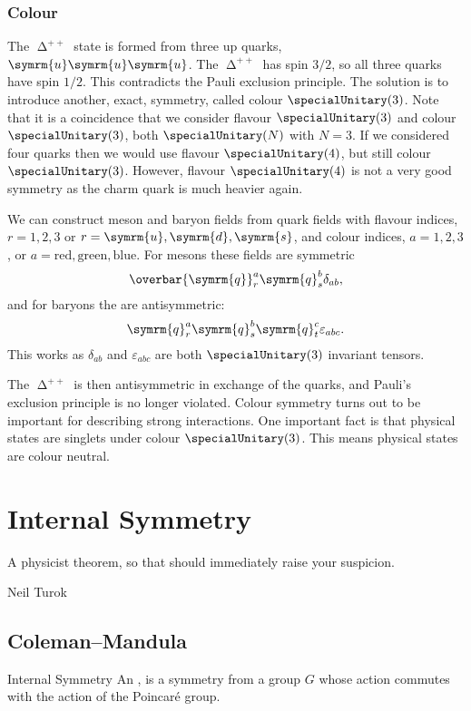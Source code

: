 \documentclass[fleqn]{NotesClass}
\newcommand{\Pparticle}[1]{\symrm{#1}}
\newcommand{\Pu}{\ensuremath{\Pparticle{u}}}
\newcommand{\Pd}{\ensuremath{\Pparticle{d}}}
\newcommand{\Ps}{\ensuremath{\Pparticle{s}}}
\newcommand{\Pq}{\ensuremath{\Pparticle{q}}}
\newcommand{\Pdeltapp}{\ensuremath{\upDelta^{++}}}
\newcommand{\diracadjoint}[1]{\overbar{#1}}
\begin{document}
    \subsection{Colour}
    The \(\Pdeltapp\) state is formed from three up quarks, \(\Pu\Pu\Pu\).
    The \(\Pdeltapp\) has spin \(3/2\), so all three quarks have spin \(1/2\).
    This contradicts the Pauli exclusion principle.
    The solution is to introduce another, exact, symmetry, called colour \(\specialUnitary(3)\).
    Note that it is a coincidence that we consider flavour \(\specialUnitary(3)\) and colour \(\specialUnitary(3)\), both \(\specialUnitary(N)\) with \(N = 3\).
    If we considered four quarks then we would use flavour \(\specialUnitary(4)\), but still colour \(\specialUnitary(3)\).
    However, flavour \(\specialUnitary(4)\) is not a very good symmetry as the charm quark is much heavier again.
    
    We can construct meson and baryon fields from quark fields with flavour indices, \(r = 1, 2, 3\) or \(r = \Pu, \Pd, \Ps\), and colour indices, \(a = 1, 2, 3\), or \(a = \text{red}, \text{green}, \text{blue}\).
    For mesons these fields are symmetric
    \begin{equation}
        \diracadjoint{\Pq}_r^a \Pq_s^b \delta_{ab},
    \end{equation}
    and for baryons the are antisymmetric:
    \begin{equation}
        \Pq_r^a \Pq_s^b \Pq_t^c \varepsilon_{abc}.
    \end{equation}
    This works as \(\delta_{ab}\) and \(\varepsilon_{abc}\) are both \(\specialUnitary(3)\) invariant tensors.
    
    The \(\Pdeltapp\) is then antisymmetric in exchange of the quarks, and Pauli's exclusion principle is no longer violated.
    Colour symmetry turns out to be important for describing strong interactions.
    One important fact is that physical states are singlets under colour \(\specialUnitary(3)\).
    This means physical states are colour neutral.
    
    \chapter{Internal Symmetry}
    \epigraph{A physicist theorem, so that should immediately raise your suspicion.}{Neil Turok}
    \section{Coleman--Mandula}
    \begin{dfn}{Internal Symmetry}{}
        An , is a symmetry from a group \(G\) whose action commutes with the action of the Poincar\'e group.
    \end{dfn}
    
\end{document}
